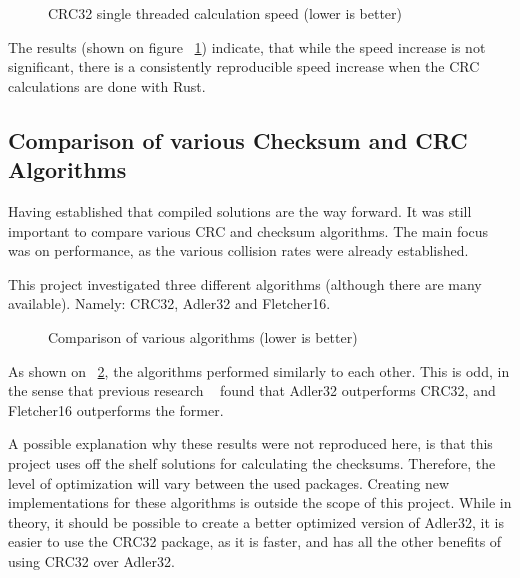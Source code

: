 \begin{figure}[h]
    \centering
    \begin{bchart}[step=50,max=350, unit=s]
        \medskip
    \end{bchart}
    \caption{CRC32 single threaded calculation speed (lower is better)}
    \label{fig:checksum_fig_2}
\end{figure}


The results (shown on figure ~\ref{fig:checksum_fig_2}) indicate,
that while the speed increase is not significant,
there is a consistently reproducible speed increase when the CRC calculations are done with Rust.


\subsection{Comparison of various Checksum and CRC Algorithms}

Having established that compiled solutions are the way forward.
It was still important to compare various CRC and checksum algorithms.
The main focus was on performance, as the various collision rates were already established.

This project investigated three different algorithms (although there are many available).
Namely:
CRC32, Adler32 and Fletcher16.

\begin{figure}[h]
    \centering
    \begin{bchart}[step=50,max=400, unit=s]
        \medskip
        \medskip
    \end{bchart}
    \caption{Comparison of various algorithms (lower is better)}
    \label{fig:checksum_fig_3}
\end{figure}

As shown on ~\ref{fig:checksum_fig_3}, the algorithms performed similarly to each other.
This is odd, in the sense that previous research ~\cite{MaxinoChecksum} found that Adler32 outperforms CRC32,
and Fletcher16 outperforms the former.

A possible explanation why these results were not reproduced here, is that this project uses off the shelf
solutions for calculating the checksums.
Therefore, the level of optimization will vary between the used packages.
Creating new implementations for these algorithms is outside the scope of this project.
While in theory, it should be possible to create a better optimized version of Adler32, it is easier
to use the CRC32 package, as it is faster, and has all the other benefits of using CRC32 over Adler32.

